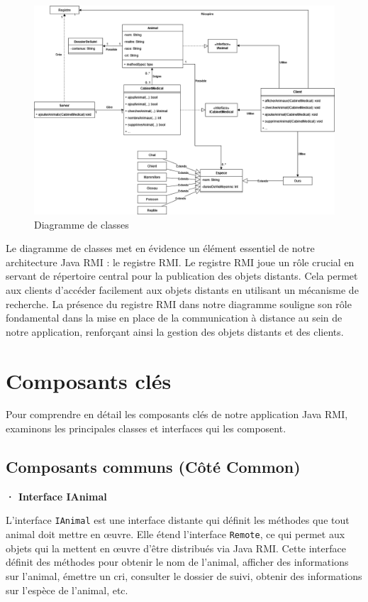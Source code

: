\documentclass{article} %
\begin{document}
\begin{figure}[h]
    \centering
    \includegraphics[width=1\textwidth]{classe}
    \caption{Diagramme de classes}
    \label{fig:diagramme-classe}
\end{figure}

Le diagramme de classes met en évidence un élément essentiel de notre architecture Java RMI : 
le registre RMI. Le registre RMI joue un rôle crucial en servant de répertoire 
central pour la publication des objets distants. 
Cela permet aux clients d'accéder facilement aux objets distants 
en utilisant un mécanisme de recherche. 
La présence du registre RMI dans notre diagramme souligne son rôle 
fondamental dans la mise en place de la communication à distance au sein de notre application, 
renforçant ainsi la gestion des objets distants et des clients.


\newpage
\section{Composants clés}

Pour comprendre en détail les composants clés de notre application Java RMI, examinons les principales classes et interfaces qui les composent.

\subsection{Composants communs (Côté Common)}


\textbf{· Interface IAnimal}
\bigskip

L'interface \texttt{IAnimal} est une interface distante qui définit les méthodes que tout animal doit mettre en œuvre. Elle étend l'interface \texttt{Remote}, ce qui permet aux objets qui la mettent en œuvre d'être distribués via Java RMI. Cette interface définit des méthodes pour obtenir le nom de l'animal, afficher des informations sur l'animal, émettre un cri, consulter le dossier de suivi, obtenir des informations sur l'espèce de l'animal, etc.
\end{document}
